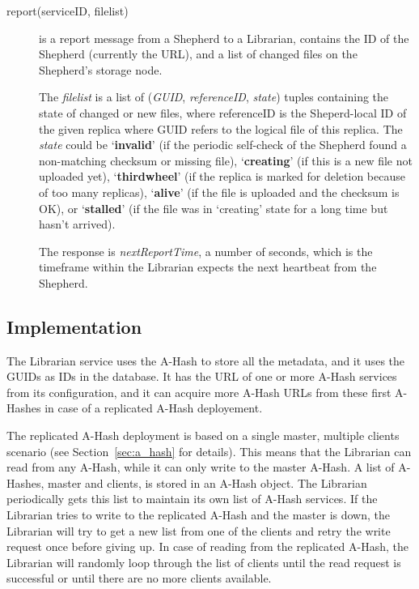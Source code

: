 \documentclass{book}
\begin{document}
\begin{description}
    \item [report(serviceID, filelist)] is a report message from a Shepherd to a Librarian, contains the ID of the Shepherd (currently the URL), and a list of changed files on the Shepherd's storage node.
        
    The \emph{filelist} is a list of (\emph{GUID}, \emph{referenceID}, \emph{state}) tuples containing the state of changed or new files, where referenceID is the Sheperd-local ID of the given replica where GUID refers to the logical file of this replica. The \emph{state} could be `\textbf{invalid}' (if the periodic self-check of the Shepherd found a non-matching checksum or missing file), `\textbf{creating}' (if this is a new file not uploaded yet), `\textbf{thirdwheel}' (if the replica is marked for deletion because of too many replicas), `\textbf{alive}' (if the file is uploaded and the checksum is OK), or `\textbf{stalled}' (if the file was in `creating' state for a long time but hasn't arrived).
    
    The response is \emph{nextReportTime}, a number of seconds, which is the timeframe within the Librarian expects the next heartbeat from the Shepherd.

\end{description}


\subsection{Implementation} %

The Librarian service uses the A-Hash to store all the metadata, and it uses the GUIDs as IDs in the database. It has the URL of one or more A-Hash services from its configuration, and it can acquire more A-Hash URLs from these first A-Hashes in case of a replicated A-Hash deployement.

The replicated A-Hash deployment is based on a single master, multiple clients scenario (see Section~\ref{sec:a_hash} for details). This means that the Librarian can read from any A-Hash, while it can only write to the master A-Hash. A list of A-Hashes, master and clients, is stored in an A-Hash object. The Librarian periodically gets this list to maintain its own list of A-Hash services. If the Librarian tries to write to the replicated A-Hash and the master is down, the Librarian will try to get a new list from one of the clients and retry the write request once before giving up. In case of reading from the replicated A-Hash, the Librarian will randomly loop through the list of clients until the read request is successful or until there are no more clients available.
\end{document}
